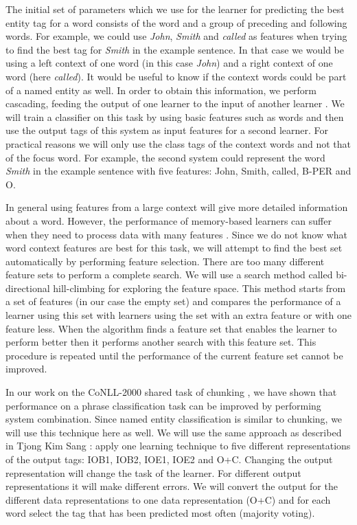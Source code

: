 \documentclass[11pt]{article}
\begin{document}
The initial set of parameters which we use for the learner for
predicting the best entity tag for a word consists of the word and a
group of preceding and following words.
For example, we could use {\it John}, {\it Smith} and {\it called}
as features when trying to find the best tag for {\it Smith} in the
example sentence.
In that case we would be using a left context of one word (in this
case {\it John}) and a right context of one word (here {\it called}).
It would be useful to know if the context words could be part of a
named entity as well.
In order to obtain this information, we perform {\sc cascading},
feeding the output of one learner to the input of another learner
\cite{veenstra98}.
We will train a classifier on this task by using basic features such
as words and then use the output tags of this system as input features
for a second learner.
For practical reasons we will only use the class tags of the context
words and not that of the focus word.
For example, the second system could represent the word {\it Smith}
in the example sentence with five features:
John, Smith, called, B-PER and O.

In general using features from a large context will give more
detailed information about a word.
However, the performance of memory-based learners can suffer when they
need to process data with many features \cite{tks2002jmlr}.
Since we do not know what word context features are best for this
task, we will attempt to find the best set automatically by performing
{\sc feature selection}.
There are too many different feature sets to perform a complete
search.
We will use a search method called bi-directional hill-climbing
\cite{caruana94} for exploring the feature space.
This method starts from a set of features (in our case the empty set)
and compares the performance of a learner using this set with learners
using the set with an extra feature or with one feature less.
When the algorithm finds a feature set that enables the learner to
perform better then it performs another search with this feature set.
This procedure is repeated until the performance of the current
feature set cannot be improved.

In our work on the CoNLL-2000 shared task of chunking
\cite{tks2002jmlr}, we have shown that performance on a phrase
classification task can be improved by performing {\sc system
combination}.
Since named entity classification is similar to chunking, we will use
this technique here as well.
We will use the same approach as described in Tjong Kim Sang
: apply one learning technique to five
different representations of the output tags: IOB1, IOB2, IOE1, IOE2
and O+C.
Changing the output representation will change the task of the
learner.
For different output representations it will make different errors.
We will convert the output for the different data representations to
one data representation (O+C) and for each word select the
tag that has been predicted most often (majority voting).
\end{document}
